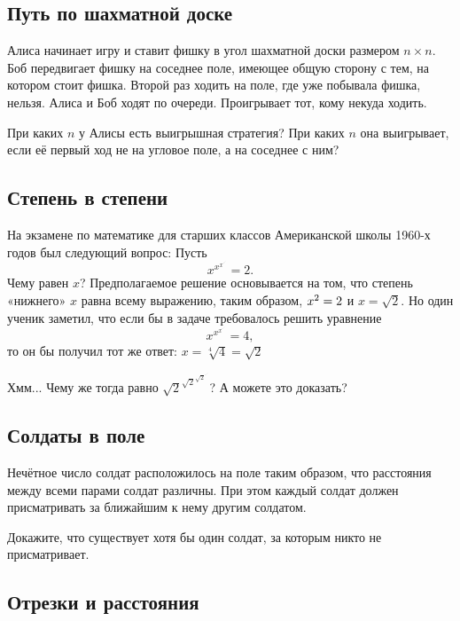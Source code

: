 \subsection*{Путь по шахматной доске} %

Алиса начинает игру и ставит фишку в угол шахматной доски размером $n{\times}n$.
Боб передвигает фишку на соседнее поле, имеющее общую сторону с тем, на котором стоит фишка.
Второй раз ходить на поле, где уже побывала фишка, нельзя. 
Алиса и Боб ходят по очереди.
Проигрывает тот, кому некуда ходить.

При каких $n$ у Алисы есть выигрышная стратегия? 
При каких $n$ она выигрывает, если её первый ход не на угловое поле, а на соседнее с ним?

\subsection*{Степень в степени} %

На экзамене по математике для старших классов Американской школы 1960-х годов 
был следующий вопрос:
Пусть
$$x^{x^{x^{{\cdot}^{\cdot^{\cdot}}}}}=2.$$
Чему равен $x$? 
Предполагаемое решение основывается на том, что степень «нижнего» $x$ равна всему выражению, таким образом, $x^2\z=2$ и $x=\sqrt{2}$.
Но один ученик заметил, что если бы в задаче требовалось решить уравнение
$$x^{x^{x^{{\cdot}^{\cdot^{\cdot}}}}}=4,$$
то он бы получил тот же ответ: $x=\sqrt[4]{4}=\sqrt{2}$

Хмм...
Чему же тогда равно ${\sqrt{2}}^{{\sqrt{2}}^{{\sqrt{2}}^{{\cdot}^{\cdot^{\cdot}}}}}$? 
А можете это доказать?

\subsection*{Солдаты в поле} %

Нечётное число солдат расположилось на поле таким образом, что расстояния между всеми парами солдат различны.
При этом каждый солдат должен присматривать за ближайшим к нему другим солдатом.

Докажите, что существует хотя бы один солдат, за которым никто не присматривает.

\subsection*{Отрезки и расстояния} %


